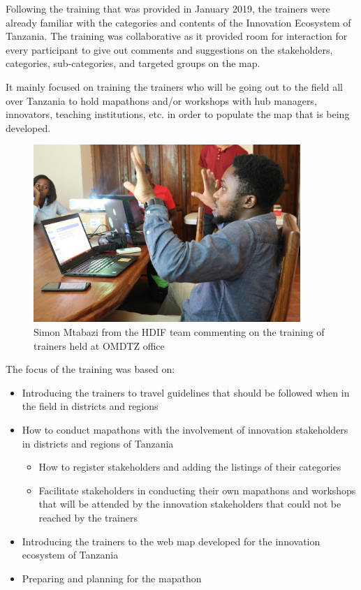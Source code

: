 \documentclass[a4paper,12pt,twoside]{article}
\begin{document}
Following the training that was provided in January 2019, the trainers were already familiar with the categories and contents of the Innovation Ecosystem of Tanzania. The training was collaborative as it provided room for interaction for every participant to give out comments and suggestions on the stakeholders, categories, sub-categories, and targeted groups on the map.  

It mainly focused on training the trainers who will be going out to the field all over Tanzania to hold mapathons and/or workshops with hub managers, innovators, teaching institutions, etc. in order to populate the map that is being developed.

\begin{figure}[H] %
	\centering
	\includegraphics[width=0.9\textwidth]{images/Simon_training.JPG}
	\caption{Simon Mtabazi from the HDIF team commenting on the training of trainers held at OMDTZ office}
\end{figure}

The focus of the training was based on:

\begin{itemize}
	\item Introducing the trainers to travel guidelines that should be followed when in the field in districts and regions
	\item How to conduct mapathons with the involvement of innovation stakeholders in districts and regions of Tanzania
	\begin{itemize}
		\item How to register stakeholders and adding the listings of their categories
		\item Facilitate stakeholders in conducting their own mapathons and workshops that will be attended by the innovation stakeholders that could not be reached by the trainers
	\end{itemize}
	\item Introducing the trainers to the web map developed for the innovation ecosystem of Tanzania
	\item Preparing and planning for the mapathon
\end{itemize}
\end{document}
